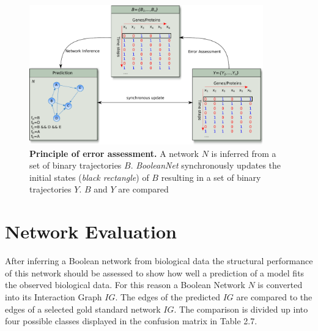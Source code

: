 \begin{figure}[H]
\captionsetup{width=0.9\linewidth}
\centering
\includegraphics[width=0.9\textwidth]{./Bilder/errorassessment.pdf}
\caption[Principle of error assessment]{\textbf{Principle of error assessment.} A network $N$ is inferred from a set of binary trajectories $B$. \textit{BooleanNet} synchronously updates the initial states (\textit{black rectangle}) of $B$ resulting in a set of binary trajectories $Y$. $B$ and $Y$ are compared }
\label{fig:Principle of Error Assessment}
\end{figure} 

\newpage
\section{Network Evaluation}
After inferring a Boolean network from biological data the structural performance of this network should be assessed to show how well a prediction of a model fits the observed biological data. For this reason a Boolean Network $N$ is converted into its Interaction Graph $IG$. The edges of the predicted $IG$ are compared to the edges of a selected gold standard network $IG$. The comparison is divided up into four possible classes displayed in the confusion matrix in Table 2.7.


